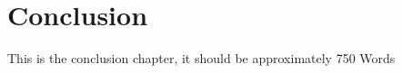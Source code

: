 
\chapter{Conclusion} %

\label{ch:conclusion} %

This is the conclusion chapter, it should be approximately 750 Words
